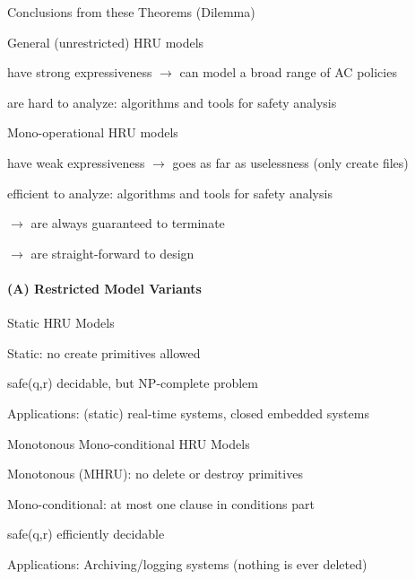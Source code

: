 \documentclass[a4paper]{article}
\begin{document}
\begin{multicols}{3}
    Conclusions from these Theorems (Dilemma)
    \begin{itemize*}
        \item General (unrestricted) HRU models
        \begin{itemize*}
            \item have strong expressiveness $\rightarrow$ can model a broad range of AC policies
            \item are hard to analyze: algorithms and tools for safety analysis
        \end{itemize*}
        \item Mono-operational HRU models
        \begin{itemize*}
            \item have weak expressiveness $\rightarrow$ goes as far as uselessness (only create files)
            \item efficient to analyze: algorithms and tools for safety analysis
            \item[$\rightarrow$] are always guaranteed to terminate
            \item[$\rightarrow$] are straight-forward to design
        \end{itemize*}
    \end{itemize*}

    \paragraph{(A) Restricted Model Variants}

    Static HRU Models
    \begin{itemize*}
        \item Static: no create primitives allowed
        \item safe(q,r) decidable, but NP-complete problem
        \item Applications: (static) real-time systems, closed embedded systems
    \end{itemize*}

    Monotonous Mono-conditional HRU Models
    \begin{itemize*}
        \item Monotonous (MHRU): no delete or destroy primitives
        \item Mono-conditional: at most one clause in conditions part
        \item safe(q,r) efficiently decidable
        \item Applications: Archiving/logging systems (nothing is ever deleted)
    \end{itemize*}


\end{multicols}
\end{document}
